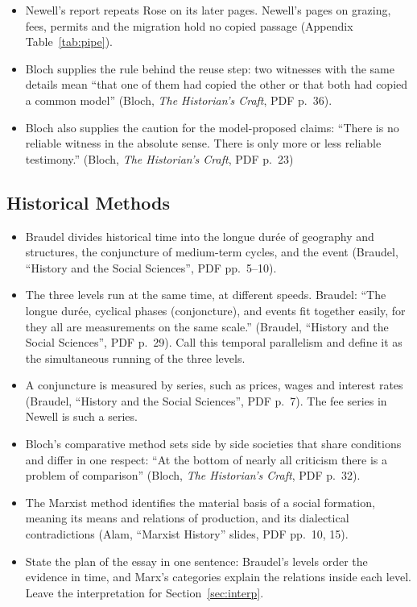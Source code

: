 \documentclass[11pt,a4paper]{article}
\newcommand{\cit}[1]{{\small(#1)}}
\newcommand{\Braudel}{Braudel, \enquote{History and the Social Sciences}}
\begin{document}
\begin{itemize}
  sources. Barnes on the Gujars in 1881 reappears in Rose, so the two pages are
  one witness \cit{1881 census, PDF p.~267; Rose, vol.~2, PDF p.~346}.
\item Newell's report repeats Rose on its later pages. Newell's pages on
  grazing, fees, permits and the migration hold no copied passage
  \cit{Appendix Table~\ref{tab:pipe}}.
\item Bloch supplies the rule behind the reuse step: two witnesses with the
  same details mean \enquote{that one of them had copied the other or that both
  had copied a common model} \cit{Bloch, \emph{The Historian's Craft}, PDF
  p.~36}.
\item Bloch also supplies the caution for the model-proposed claims:
  \enquote{There is no reliable witness in the absolute sense. There is only
  more or less reliable testimony.} \cit{Bloch, \emph{The Historian's Craft},
  PDF p.~23}
\end{itemize}

\subsection{Historical Methods}
\begin{itemize}
\item Braudel divides historical time into the longue durée of geography and
  structures, the conjuncture of medium-term cycles, and the event \cit{\Braudel,
  PDF pp.~5--10}.
\item The three levels run at the same time, at different speeds. Braudel:
  \enquote{The longue durée, cyclical phases (conjoncture), and events fit
  together easily, for they all are measurements on the same scale.}
  \cit{\Braudel, PDF p.~29}. Call this temporal parallelism and define it as
  the simultaneous running of the three levels.
\item A conjuncture is measured by series, such as prices, wages and interest
  rates \cit{\Braudel, PDF p.~7}. The fee series in Newell is such a series.
\item Bloch's comparative method sets side by side societies that share
  conditions and differ in one respect: \enquote{At the bottom of nearly all
  criticism there is a problem of comparison} \cit{Bloch, \emph{The Historian's
  Craft}, PDF p.~32}.
\item The Marxist method identifies the material basis of a social formation,
  meaning its means and relations of production, and its dialectical
  contradictions \cit{Alam, \enquote{Marxist History} slides, PDF pp.~10, 15}.
\item State the plan of the essay in one sentence: Braudel's levels order the
  evidence in time, and Marx's categories explain the relations inside each
  level. Leave the interpretation for Section~\ref{sec:interp}.
\end{itemize}
\end{document}
